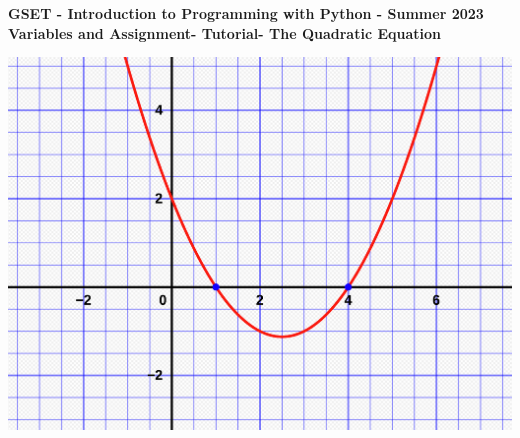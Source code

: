 \documentclass[12pt]{article}
\newcommand{\MNUM}{2} %
\newcommand{\MNAME}{Variables and Assignment} %
\newcommand{\TNAME}{The Quadratic Equation} %
\begin{document}
\thispagestyle{plain}

\begin{center}
   {\bf \large GSET - Introduction to Programming with Python - Summer 2023} \vspace{5mm}\\
   {\bf \Large \MNAME \hspc -  Tutorial\hspc\MNUM\hspc - \TNAME}\vspace{3mm}\\
   
\end{center}

 \hspace*{3cm}\includegraphics[scale=.15]{quad_equ.png} 
\end{document}

